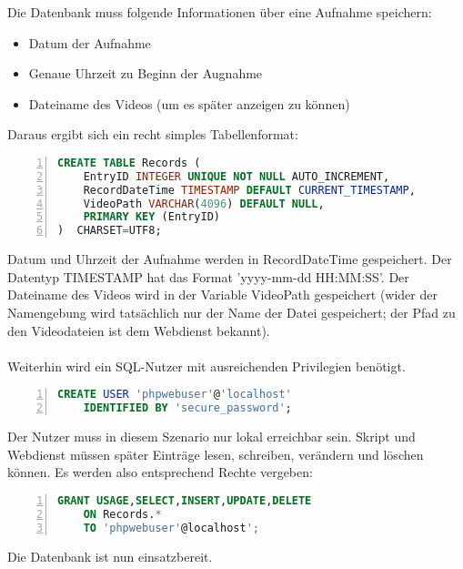 Die Datenbank muss folgende Informationen \"uber eine Aufnahme speichern:
\begin{itemize}
    \item Datum der Aufnahme
    \item Genaue Uhrzeit zu Beginn der Augnahme
    \item Dateiname des Videos (um es sp\"ater anzeigen zu k\"onnen)
\end{itemize}
\vspace{0.5cm}
Daraus ergibt sich ein recht simples Tabellenformat:\\

\begin{lstlisting}[language=SQL,caption={Auszug aus dbRecords.sql},numbers=left,frame=lrbt]
CREATE TABLE Records (
    EntryID INTEGER UNIQUE NOT NULL AUTO_INCREMENT,
    RecordDateTime TIMESTAMP DEFAULT CURRENT_TIMESTAMP,
    VideoPath VARCHAR(4096) DEFAULT NULL,
    PRIMARY KEY (EntryID)
)  CHARSET=UTF8;
\end{lstlisting}
\vspace{0.5cm}
Datum und Uhrzeit der Aufnahme werden in RecordDateTime gespeichert.
Der Datentyp TIMESTAMP hat das Format 'yyyy-mm-dd HH:MM:SS'.
Der Dateiname des Videos wird in der Variable VideoPath gespeichert (wider der Namengebung wird tats\"achlich nur der Name der Datei gespeichert; der Pfad zu den Videodateien ist dem Webdienst bekannt).\\
\\
Weiterhin wird ein SQL-Nutzer mit ausreichenden Privilegien ben\"otigt.\\
\begin{lstlisting}[language=SQL,caption={Anlegen des Datenbank-Nutzers},numbers=left,frame=lrbt]
CREATE USER 'phpwebuser'@'localhost'
    IDENTIFIED BY 'secure_password';
\end{lstlisting}
\vspace{0.5cm}
Der Nutzer muss in diesem Szenario nur lokal erreichbar sein.
Skript und Webdienst m\"ussen sp\"ater Eintr\"age lesen, schreiben, ver\"andern und l\"oschen k\"onnen. Es werden also entsprechend Rechte vergeben:\\
\newpage
\begin{lstlisting}[language=SQL,caption={Die Rechte des Datenbank-Nutzers},numbers=left,frame=lrbt]
GRANT USAGE,SELECT,INSERT,UPDATE,DELETE 
    ON Records.* 
    TO 'phpwebuser'@localhost';
\end{lstlisting}
\vspace{0.5cm}
Die Datenbank ist nun einsatzbereit.
\vspace{1.5cm}
